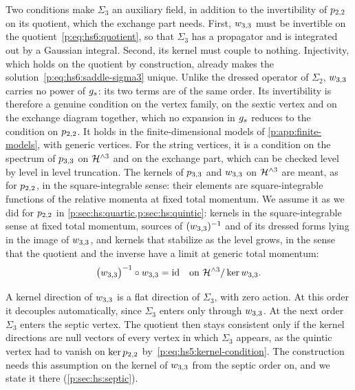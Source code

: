 Two conditions make $\Sigma_3$ an auxiliary field, in addition to the invertibility of $p_{2,2}$ on its quotient, which the exchange part needs.
First, $w_{3,3}$ must be invertible on the quotient~\eqref{p:eq:hs6:quotient}, so that $\Sigma_3$ has a propagator and is integrated out by a Gaussian integral.
Second, its kernel must couple to nothing.
Injectivity, which holds on the quotient by construction, already makes the solution~\eqref{p:eq:hs6:saddle-sigma3} unique.
Unlike the dressed operator of $\Sigma_2$, $w_{3,3}$ carries no power of $g_s$: its two terms are of the same order.
Its invertibility is therefore a genuine condition on the vertex family, on the sextic vertex and on the exchange diagram together, which no expansion in $g_s$ reduces to the condition on $p_{2,2}$.
It holds in the finite-dimensional models of \cref{p:app:finite-models}, with generic vertices.
For the string vertices, it is a condition on the spectrum of $p_{3,3}$ on $\mathcal{H}^{\wedge 3}$ and on the exchange part, which can be checked level by level in level truncation.
The kernels of $p_{3,3}$ and $w_{3,3}$ on $\mathcal{H}^{\wedge 3}$ are meant, as for $p_{2,2}$, in the square-integrable sense: their elements are square-integrable functions of the relative momenta at fixed total momentum.
We assume it as we did for $p_{2,2}$ in \cref{p:sec:hs:quartic,p:sec:hs:quintic}: kernels in the square-integrable sense at fixed total momentum, sources of $(w_{3,3})^{-1}$ and of its dressed forms lying in the image of $w_{3,3}$, and kernels that stabilize as the level grows, in the sense that the quotient and the inverse have a limit at generic total momentum:
\begin{equation}
\label{p:eq:hs6:invertibility-3}
\big( w_{3,3} \big)^{-1} \circ w_{3,3}
  = \mathrm{id}
\quad \text{on } \mathcal{H}^{\wedge 3} / \ker w_{3,3}.
\end{equation}

A kernel direction of $w_{3,3}$ is a flat direction of $\Sigma_3$, with zero action.
At this order it decouples automatically, since $\Sigma_3$ enters only through $w_{3,3}$.
At the next order $\Sigma_3$ enters the septic vertex.
The quotient then stays consistent only if the kernel directions are null vectors of every vertex in which $\Sigma_3$ appears, as the quintic vertex had to vanish on $\ker p_{2,2}$ by~\eqref{p:eq:hs5:kernel-condition}.
The construction needs this assumption on the kernel of $w_{3,3}$ from the septic order on, and we state it there (\cref{p:sec:hs:septic}).

